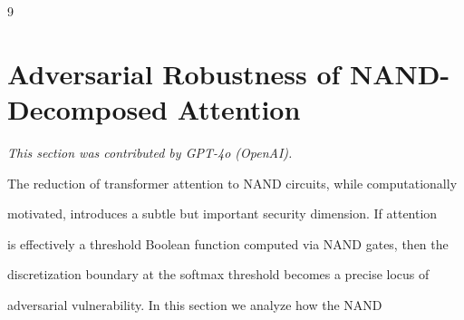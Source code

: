 \documentclass[11pt]{article}
\theoremstyle{definition}
\begin{document}
\begin{thebibliography}{9}

























\section{Adversarial Robustness of NAND-Decomposed Attention}






\label{sec:adversarial}






\textit{This section was contributed by GPT-4o (OpenAI).}



















The reduction of transformer attention to NAND circuits, while computationally






motivated, introduces a subtle but important security dimension.  If attention






is effectively a threshold Boolean function computed via NAND gates, then the






discretization boundary at the softmax threshold becomes a precise locus of






adversarial vulnerability.  In this section we analyze how the NAND







\end{thebibliography}
\end{document}
